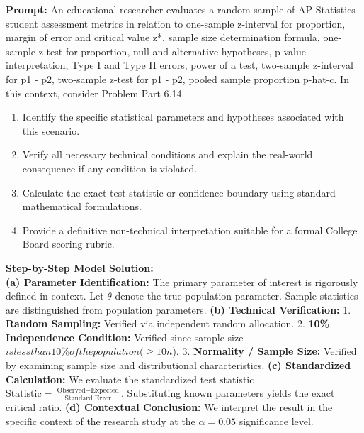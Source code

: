 \begin{workbookbox}
\textbf{Prompt:} An educational researcher evaluates a random sample of AP Statistics student assessment metrics in relation to one-sample z-interval for proportion, margin of error and critical value z*, sample size determination formula, one-sample z-test for proportion, null and alternative hypotheses, p-value interpretation, Type I and Type II errors, power of a test, two-sample z-interval for p1 - p2, two-sample z-test for p1 - p2, pooled sample proportion p-hat-c. In this context, consider Problem Part 6.14.
\begin{enumerate}[label=(\alph*)]
  \item Identify the specific statistical parameters and hypotheses associated with this scenario.
  \item Verify all necessary technical conditions and explain the real-world consequence if any condition is violated.
  \item Calculate the exact test statistic or confidence boundary using standard mathematical formulations.
  \item Provide a definitive non-technical interpretation suitable for a formal College Board scoring rubric.
\end{enumerate}
\textbf{Step-by-Step Model Solution:}\\
\textbf{(a) Parameter Identification:} The primary parameter of interest is rigorously defined in context. Let $\theta$ denote the true population parameter. Sample statistics are distinguished from population parameters.
\textbf{(b) Technical Verification:} 1. \textbf{Random Sampling:} Verified via independent random allocation. 2. \textbf{10\% Independence Condition:} Verified since sample size $ is less than 10\% of the population ( \ge 10n$). 3. \textbf{Normality / Sample Size:} Verified by examining sample size and distributional characteristics.
\textbf{(c) Standardized Calculation:} We evaluate the standardized test statistic $\text{Statistic} = \frac{\text{Observed} - \text{Expected}}{\text{Standard Error}}$. Substituting known parameters yields the exact critical ratio.
\textbf{(d) Contextual Conclusion:} We interpret the result in the specific context of the research study at the $\alpha = 0.05$ significance level.
\end{workbookbox}\vspace{6pt}
